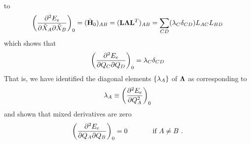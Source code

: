 \documentclass[11pt]{article}
\begin{document}
to
\begin{align*}
%
    \pr{\fr{\pt^2E_e}{\pt\tl{X}_A\pt\tl{X}_B}}_0
=
    (\tl{\bo{H}}_0)_{AB}
=
    (\bo{L}\bm\La\bo{L}^T)_{AB}
=
    \sum_{CD}
    (\la_C\d_{CD})L_{AC}L_{BD}
\end{align*}
which shows that
\begin{align}
%
    \pr{\fr{\pt^2E_e}{\pt Q_C\pt Q_D}}_0
=
    \la_C\d_{CD}
\end{align}
That is, we have identified the diagonal elements $\{\lambda_A\}$ of $\bm{\Lambda}$ as corresponding to
\begin{align}
    \lambda_A \equiv \left( \dfrac{ \partial^{2} E_e }{\partial Q_A ^{2}}\right)_0
\end{align}
and shown that mixed derivatives are zero
\begin{align}
    \left(\dfrac{\partial^2E_e}{\partial Q_A\partial Q_B}\right)_0
=
    0
\ \ \ \ \ \ \ \ \ \ 
    \text{ if } A\neq B \ .
\end{align}
\end{document}
